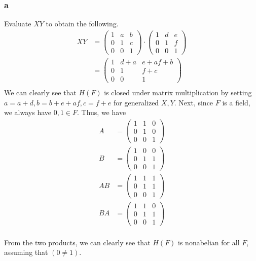\documentclass[11 pt]{article}
\theoremstyle{definition}
\theoremstyle{remark}
\begin{document}
\subsubsection*{a}
Evaluate $XY$ to obtain the following.
\begin{align*}
XY &= \begin{pmatrix}
1 & a & b\\
0 & 1 & c\\
0 & 0 & 1
\end{pmatrix} \cdot \begin{pmatrix}
1 & d & e\\
0 & 1 & f\\
0 & 0 & 1
\end{pmatrix} \\
&= 
\begin{pmatrix}
1 & d+a & e+af+b\\
0 & 1 & f+c\\
0 & 0 & 1
\end{pmatrix}
\\
\end{align*}
We can clearly see that $H(F)$ is closed under matrix multiplication by setting $a = a+d, b = b+e+af, c = f+e$ for generalized $X,Y$. Next, since $F$ is a field, we always have $0,1 \in F$. Thus, we have
\begin{align*}
A &= 
\begin{pmatrix}
1 & 1 & 0\\
0 & 1 & 0\\
0 & 0 & 1
\end{pmatrix}
\\
B &= 
\begin{pmatrix}
1 & 0 & 0\\
0 & 1 & 1\\
0 & 0 & 1
\end{pmatrix}
\\
AB &= 
\begin{pmatrix}
1 & 1 & 1\\
0 & 1 & 1\\
0 & 0 & 1
\end{pmatrix}
\\
BA &= 
\begin{pmatrix}
1 & 1 & 0\\
0 & 1 & 1\\
0 & 0 & 1
\end{pmatrix}
\\
\end{align*}

From the two products, we can clearly see that $H(F)$ is nonabelian for all $F$, assuming that $(0 \neq 1)$.
\end{document}
